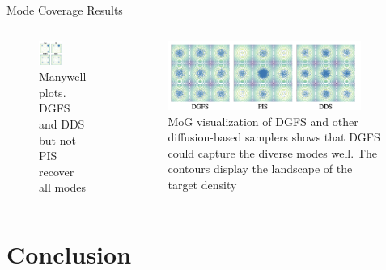 \documentclass[aspectratio=169,xcolor=dvipsnames]{beamer}
\begin{document}
\begin{frame}[t]{Mode Coverage Results}

\begin{columns}[t]
\begin{column}{0.48\textwidth}
\begin{figure}
    \centering
    \includegraphics[width=0.5\textwidth]{figures/mode.png}
    \caption{Manywell plots. DGFS and DDS but not PIS recover all modes}
\end{figure}
\end{column}
\begin{column}{0.48\textwidth}
\begin{figure}
    \centering
    \includegraphics[width=0.9\textwidth]{figures/MoG.png}
    \caption{MoG visualization of DGFS and other diffusion-based samplers shows that DGFS could capture the diverse modes well. The contours display the landscape of the target density}
\end{figure}
\end{column}
\end{columns}
    
\end{frame}

\section{Conclusion}
\end{document}
